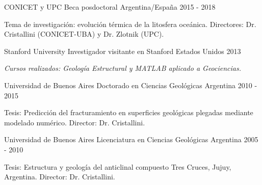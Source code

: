 

\begin{cventries}




\cventry
    {CONICET y UPC}
    {Beca posdoctoral}
    {Argentina/España}
    {2015 - 2018}
    {
      \begin{cvitems} %
        \item {Tema de investigación: evolución térmica de la litosfera oceánica.
Directores: Dr. Cristallini (CONICET-UBA) y Dr. Zlotnik (UPC).}
      \end{cvitems}
    }

\cventry
    {Stanford University}
    {Investigador visitante en Stanford}
    {Estados Unidos}
    {2013}
    {
      \begin{cvitems} %
        \item {\emph{Cursos realizados: Geología Estructural y MATLAB aplicado a Geociencias.}}
      \end{cvitems}
    }

\cventry
    {Universidad de Buenos Aires}
    {Doctorado en Ciencias Geológicas}
    {Argentina}
    {2010 - 2015}
    {
      \begin{cvitems} %
        \item {Tesis: Predicción del fracturamiento en superficies geológicas plegadas mediante modelado numérico. Director: Dr. Cristallini.}
      \end{cvitems}
    }

\cventry
    {Universidad de Buenos Aires}
    {Licenciatura en Ciencias Geológicas}
    {Argentina}
    {2005 - 2010}
    {
      \begin{cvitems} %
        \item {Tesis: Estructura y geología del anticlinal compuesto Tres Cruces, Jujuy, Argentina. Director: Dr. Cristallini.}
      \end{cvitems}
    }

\end{cventries}
